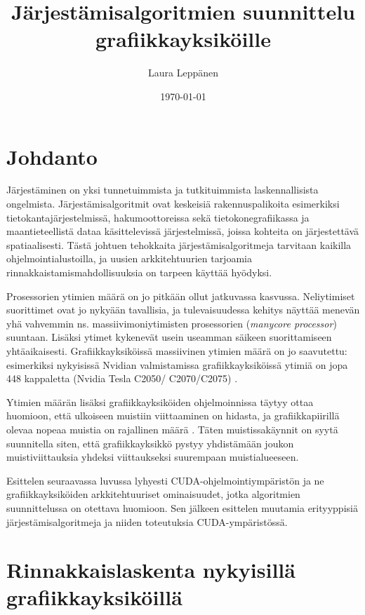 \documentclass[a4paper,11pt]{article}
\begin{document}
\title{Järjestämisalgoritmien suunnittelu grafiikkayksiköille}
\author{Laura Leppänen}
\date{\today}
\maketitle

\tableofcontents
\onehalfspacing

\newpage

\section{Johdanto}

Järjestäminen on yksi tunnetuimmista ja tutkituimmista laskennallisista ongelmista. Järjestämisalgoritmit ovat keskeisiä rakennuspalikoita esimerkiksi tietokantajärjestelmissä, hakumoottoreissa sekä tietokonegrafiikassa ja maantieteellistä dataa käsittelevissä järjestelmissä, joissa kohteita on järjestettävä spatiaalisesti. Tästä johtuen tehokkaita järjestämisalgoritmeja tarvitaan kaikilla ohjelmointialustoilla, ja uusien arkkitehtuurien tarjoamia rinnakkaistamismahdollisuuksia on tarpeen käyttää hyödyksi.

Prosessorien ytimien määrä on jo pitkään ollut jatkuvassa kasvussa. Neliytimiset suorittimet ovat jo nykyään tavallisia, ja tulevaisuudessa kehitys näyttää menevän yhä vahvemmin ns. massiivimoniytimisten prosessorien (\emph{\foreignlanguage{english}{manycore processor}}) suuntaan. Lisäksi ytimet kykenevät usein useamman säikeen suorittamiseen yhtäaikaisesti. Grafiikkayksiköissä massiivinen ytimien määrä on jo saavutettu: esimerkiksi nykyisissä Nvidian valmistamissa grafiikkayksiköissä ytimiä on jopa 448 kappaletta (Nvidia Tesla C2050/ C2070/C2075) \cite{nvidiafermi2010}.

Ytimien määrän lisäksi grafiikkayksiköiden ohjelmoinnissa täytyy ottaa huomioon, että ulkoiseen muistiin viittaaminen on hidasta, ja grafiikkapiirillä olevaa nopeaa muistia on rajallinen määrä \cite{leischner2010}. Täten muistissakäynnit on syytä suunnitella siten, että grafiikkayksikkö pystyy yhdistämään joukon muistiviittauksia yhdeksi viittaukseksi suurempaan muistialueeseen.

Esittelen seuraavassa luvussa lyhyesti CUDA-ohjelmointiympäristön ja ne grafiikkayksiköiden arkkitehtuuriset ominaisuudet, jotka algoritmien suunnittelussa on otettava huomioon. Sen jälkeen esittelen muutamia erityyppisiä järjestämisalgoritmeja ja niiden toteutuksia CUDA-ympäristössä.

\section{Rinnakkaislaskenta nykyisillä grafiikkayksiköillä}
\end{document}
